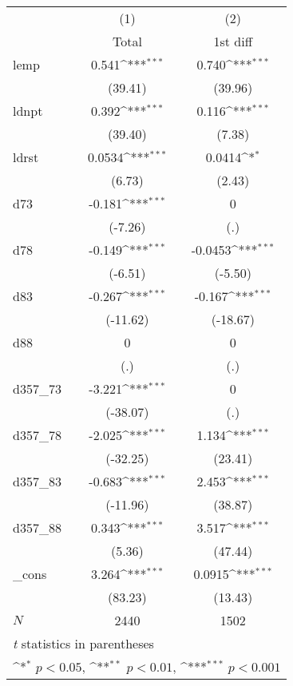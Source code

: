 {
\def\sym#1{\ifmmode^{#1}\else\(^{#1}\)\fi}
\begin{tabular}{l*{2}{c}}
\hline\hline
            &\multicolumn{1}{c}{(1)}&\multicolumn{1}{c}{(2)}\\
            &\multicolumn{1}{c}{Total}&\multicolumn{1}{c}{1st diff}\\
\hline
lemp        &       0.541\sym{***}&       0.740\sym{***}\\
            &     (39.41)         &     (39.96)         \\
[1em]
ldnpt       &       0.392\sym{***}&       0.116\sym{***}\\
            &     (39.40)         &      (7.38)         \\
[1em]
ldrst       &      0.0534\sym{***}&      0.0414\sym{*}  \\
            &      (6.73)         &      (2.43)         \\
[1em]
d73         &      -0.181\sym{***}&           0         \\
            &     (-7.26)         &         (.)         \\
[1em]
d78         &      -0.149\sym{***}&     -0.0453\sym{***}\\
            &     (-6.51)         &     (-5.50)         \\
[1em]
d83         &      -0.267\sym{***}&      -0.167\sym{***}\\
            &    (-11.62)         &    (-18.67)         \\
[1em]
d88         &           0         &           0         \\
            &         (.)         &         (.)         \\
[1em]
d357\_73     &      -3.221\sym{***}&           0         \\
            &    (-38.07)         &         (.)         \\
[1em]
d357\_78     &      -2.025\sym{***}&       1.134\sym{***}\\
            &    (-32.25)         &     (23.41)         \\
[1em]
d357\_83     &      -0.683\sym{***}&       2.453\sym{***}\\
            &    (-11.96)         &     (38.87)         \\
[1em]
d357\_88     &       0.343\sym{***}&       3.517\sym{***}\\
            &      (5.36)         &     (47.44)         \\
[1em]
\_cons      &       3.264\sym{***}&      0.0915\sym{***}\\
            &     (83.23)         &     (13.43)         \\
\hline
\(N\)       &        2440         &        1502         \\
\hline\hline
\multicolumn{3}{l}{\footnotesize \textit{t} statistics in parentheses}\\
\multicolumn{3}{l}{\footnotesize \sym{*} \(p<0.05\), \sym{**} \(p<0.01\), \sym{***} \(p<0.001\)}\\
\end{tabular}
}
